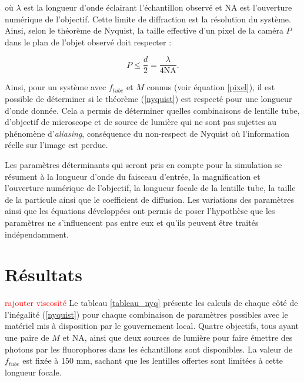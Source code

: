 \documentclass[conference]{IEEEtran}
\begin{document}
où $\lambda$ est la longueur d'onde éclairant l'échantillon observé et NA est l'ouverture numérique de
l'objectif. Cette limite de diffraction est la résolution du système. Ainsi, selon le théorème
de Nyquist, la taille effective d'un pixel de la caméra $P$ dans le plan de l'objet observé doit respecter :

\begin{equation}\label{nyquist}
  P \leq \frac{d}{2} = \frac{\lambda}{4 \text{NA} }.
\end{equation}


Ainsi, pour un système avec $f_{tube}$ et $M$ connus (voir équation \ref{pixel}), il est possible de déterminer si le théorème 
(\ref{nyquist}) est respecté pour une longueur d'onde donnée. Cela a permis de déterminer quelles 
combinaisons de lentille tube, d'objectif de microscope et de source de lumière qui ne sont pas 
sujettes au phénomène d'\textit{aliasing}, conséquence du non-respect de Nyquist où l'information
réelle sur l'image est perdue.

Les paramètres déterminants qui seront pris en compte pour la simulation se résument à la longueur d'onde du faisceau d'entrée,
la magnification et l'ouverture numérique de l'objectif, la longueur focale de la lentille tube, la taille de la particule ainsi que le 
coefficient de diffusion. Les variations des paramètres ainsi que les équations
développées ont permis de poser l'hypothèse que les paramètres ne s'influencent pas entre eux et qu'ils peuvent être traités indépendamment.




\section{Résultats \label{resultats}}
\textcolor{red}{rajouter viscosité} Le tableau \ref{tableau_nyq} présente les calculs de chaque côté de l'inégalité (\ref{nyquist}) pour
chaque combinaison de paramètres possibles avec le matériel mis à disposition par le gouvernement local.
Quatre objectifs, tous ayant une paire de $M$ et NA, ainsi que deux sources de lumière pour faire émettre
des photons par les fluorophores dans les échantillons sont disponibles. La valeur de $f_{tube}$ est fixée à 150 mm, sachant que les lentilles offertes sont limitées à cette longueur focale.
\end{document}
